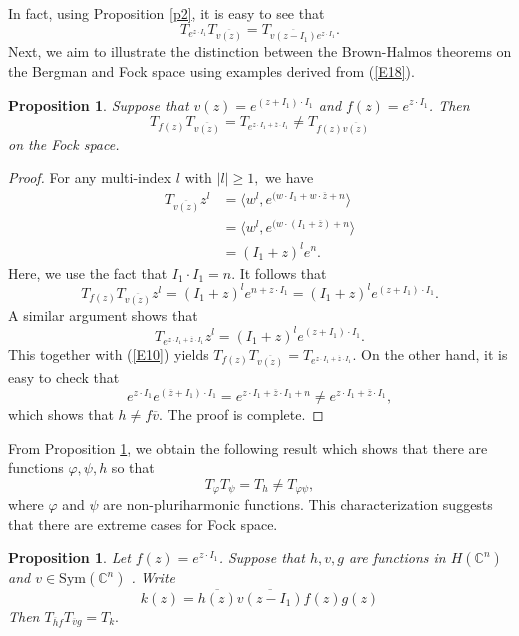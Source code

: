 \documentclass[11pt,reqno]{amsart}
\newtheorem{prop}[theorem]{Proposition}
\theoremstyle{definition}
\begin{document}
In fact, using Proposition \ref{p2}, it is easy to see that
\begin{equation}\label{E18}
T_{e^{z\cdot I_1}}T_{\overline{v(z)}}=T_{\overline{v(z-I_1)}e^{z\cdot I_1}}.
\end{equation}
 Next, we aim to illustrate the distinction between the Brown-Halmos theorems on the Bergman and Fock space using examples derived from (\ref{E18}).  
\begin{prop}\label{l3}
Suppose that $v(z)=e^{(z+I_1)\cdot{I_1}}$ and $f(z)=e^{z\cdot I_1}$. Then $$T_{f(z)}T_{\overline{v(z)}}=T_{e^{z\cdot I_1+\overline{z}\cdot{I_1}}}\neq T_{f(z)\overline{v(z)}}$$ on the Fock space.
\end{prop}
\begin{proof}
For any multi-index $l$ with $|l|\geq 1,$  we have
\begin{align*}
T_{\overline{v(z)}}z^l&=\langle w^l,e^{(w\cdot I_1+w\cdot \overline{z}+n}\rangle\\
&=\langle w^l,e^{(w\cdot ( I_1+ \overline{z})+n}\rangle\\
&=( I_1+ z)^l e^n.
\end{align*}
Here, we use the fact that $I_1\cdot I_1=n$.
It follows that
\begin{equation}\label{E10}
T_{f(z)}T_{\overline{v(z)}}z^l=( I_1+ z)^l e^{n+z\cdot I_1}=( I_1+ z)^l e^{(z+I_1)\cdot I_1}.
\end{equation}
A similar argument shows that $$T_{e^{z\cdot I_1+\overline{z}\cdot{I_1}}}z^l=( I_1+ z)^l e^{(z+I_1)\cdot I_1}.$$
This together with (\ref{E10}) yields $T_{f(z)}T_{\overline{v(z)}}=T_{e^{z\cdot I_1+\overline{z}\cdot{I_1}}}$. On the other hand, it is easy to check that
$$e^{z\cdot I_1}e^{(\overline{z}+I_1)\cdot{I_1}}=e^{z\cdot I_1+\overline{z}\cdot I_1+n}\neq e^{z\cdot
I_1+\overline{z}\cdot{I_1}},$$ which shows that $h\neq f\overline{v}.$ The proof is complete.
\end{proof}
From Proposition \ref{l3}, we obtain the following result which shows that
there are functions $\varphi,\psi,h$ so that $$T_\varphi T_\psi=T_h\neq T_{\varphi\psi},$$
where $\varphi$ and $\psi$ are non-pluriharmonic functions.
 This characterization suggests that there are extreme cases for Fock space.
\begin{prop}\label{p1}
Let $f(z)=e^{z\cdot I_1}$. Suppose that $h,v,g$ are functions 
in  $H(\mathbb{C}^n)$ and $v\in \mathrm{Sym}(\mathbb{C}^n)$ .
Write  \begin{equation*}
k(z)=\overline{h(z)}\overline{v(z-I_1)}f(z)g(z)
\end{equation*}
 Then $T_{\overline{h}f}T_{\overline{v}g}=T_k.$
\end{prop}
\end{document}
